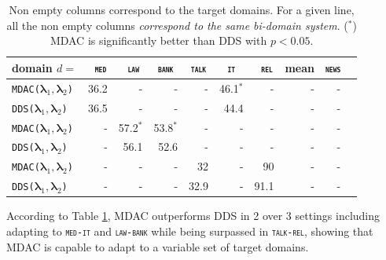 \documentclass[11pt]{article}
\newcommand{\domain}[1]{\texttt{\textsc{#1}}}
\newcommand{\system}[1]{\texttt{{#1}}}
\newcommand{\vlambda}{\ensuremath{\boldsymbol\lambda}\xspace} %
\begin{document}
\begin{table}[htbp]
  \centering \small
  \begin{tabular}{|l|*9{r|}} \hline
    domain \hfill $d=$ & \multicolumn{1}{c|}{\domain{ med}} & \multicolumn{1}{c|}{\domain{ law}} & \multicolumn{1}{c|}{\domain{bank}} & \multicolumn{1}{c|}{\domain{talk}} & \multicolumn{1}{c|}{\domain{ it }} & \multicolumn{1}{c|}{\domain{ rel}} & \multicolumn{1}{c|}{mean} & \multicolumn{1}{|c|}{\domain{news}} \\ \hline \hline
    \system{MDAC($\vlambda_1, \vlambda_2$)}&36.2&-&-&-&46.1$^*$&-&-&- \\
    \system{DDS($\vlambda_1, \vlambda_2$)}&36.5&-&-&-&44.4&-&-&- \\
    \system{MDAC($\vlambda_1, \vlambda_2$)}&-&57.2$^*$&53.8$^*$&-&-&-&-&- \\
    \system{DDS($\vlambda_1, \vlambda_2$)}&-&56.1&52.6&-&-&-&-&- \\
    \system{MDAC($\vlambda_1, \vlambda_2$)}&-&-&-&32&-&90&-&- \\
    \system{DDS($\vlambda_1, \vlambda_2$)}&-&-&-&32.9&-&91.1&-&- \\ \hline
  \end{tabular}
  \caption{Non empty columns correspond to the target domains. For a given line, all the non empty columns \emph{correspond to the same bi-domain system}. ($^*$) MDAC is significantly better than DDS with $p<0.05$.}
  \label{tab:bi-da}
\end{table}
According to Table \ref{tab:bi-da}, MDAC outperforms DDS in 2 over 3 settings including adapting to \domain{med-it} and \domain{law-bank} while being surpassed in \domain{talk-rel}, showing that MDAC is capable to adapt to a variable set of target domains.
\end{document}

